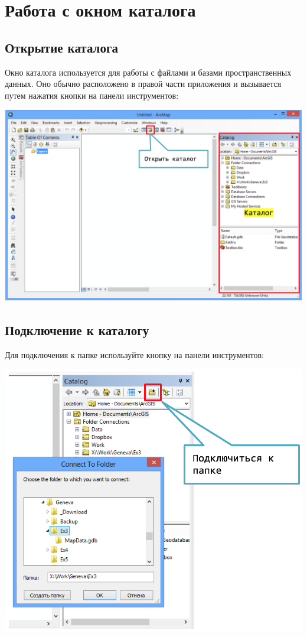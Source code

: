 \documentclass[12pt,]{book}
\begin{document}
\hypertarget{appendix--}{%
\appendix}


\hypertarget{manual-catalog}{%
\chapter{Работа с окном каталога}\label{manual-catalog}}

\hypertarget{section-5}{%
\section{Открытие каталога}\label{section-5}}

Окно каталога используется для работы с файлами и базами пространственных данных. Оно обычно расположено в правой части приложения и вызывается путем нажатия кнопки на панели инструментов:

\includegraphics{images/Appendix/image1.png}

\hypertarget{section-6}{%
\section{Подключение к каталогу}\label{section-6}}

Для подключения к папке используйте кнопку на панели инструментов:

\includegraphics{images/Appendix/image2.png}
\end{document}

